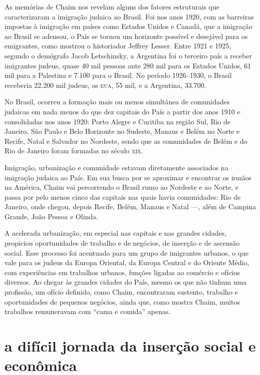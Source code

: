 As memórias de Chaim nos revelam alguns dos fatores estruturais que
caracterizaram a imigração judaica ao Brasil. Foi nos anos 1920, com as
barreiras impostas à imigração em países como Estados Unidos e Canadá,
que a imigração ao Brasil se adensou, o País se tornou um horizonte
possível e desejável para os emigrantes, como mostrou o historiador
Jeffrey Lesser. Entre 1921 e 1925, segundo o demógrafo Jacob
Letschinsky, a Argentina foi o terceiro país a receber imigrantes
judeus, quase 40 mil pessoas ante 280 mil para os Estados Unidos, 61 mil
para a Palestina e 7.100 para o Brasil. No período 1926--1930, o Brasil
receberia 22.200 mil judeus, os \textsc{eua}, 55 mil, e a Argentina, 33.700.

No Brasil, ocorreu a formação mais ou menos simultânea de comunidades
judaicas em nada menos do que dez capitais do País a partir dos anos
1910 e consolidadas nos anos 1920: Porto Alegre e Curitiba na região
Sul, Rio de Janeiro, São Paulo e Belo Horizonte no Sudeste, Manaus e
Belém no Norte e Recife, Natal e Salvador no Nordeste, sendo que as
comunidades de Belém e do Rio de Janeiro foram formadas no século \textsc{xix}.

Imigração, urbanização e comunidade estavam diretamente associados na
imigração judaica ao País. Em sua busca por se aproximar e encontrar os
irmãos na América, Chaim vai percorrendo o Brasil rumo ao Nordeste e ao
Norte, e passa por pelo menos cinco das capitais nas quais havia
comunidades: Rio de Janeiro, onde chegou, depois Recife, Belém, Manaus e
Natal ---, além de Campina Grande, João Pessoa e Olinda.

A acelerada urbanização, em especial nas capitais e nas grandes cidades,
propiciou oportunidades de trabalho e de negócios, de inserção e de
ascensão social. Esse processo foi acentuado para um grupo de imigrantes
urbanos, o que vale para os judeus da Europa Oriental, da Europa Central
e do Oriente Médio, com experiências em trabalhos urbanos, funções
ligadas ao comércio e ofícios diversos. Ao chegar às grandes cidades do
País, mesmo os que não tinham uma profissão, um ofício definido, como
Chaim, encontraram sustento, trabalho e oportunidades de pequenos
negócios, ainda que, como mostra Chaim, muitos trabalhos remuneravam com
``cama e comida'' apenas.

\section{a difícil jornada da inserção social e econômica}

